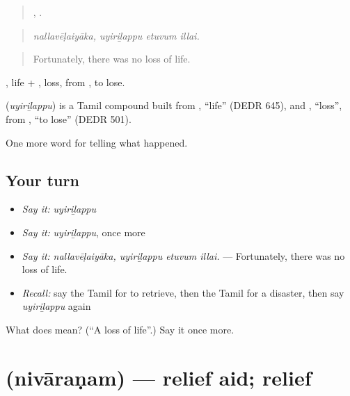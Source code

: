 \begin{quote}
,   .
\end{quote}

\begin{quote}
\emph{nallavēḷaiyāka, uyiriḻappu etuvum illai.}
\end{quote}

\begin{quote}
Fortunately, there was no loss of life.
\end{quote}

, life + , loss, from , to lose.

\begin{cousinweb}
\textbf{} (\emph{uyiriḻappu}) is a Tamil compound built from , \textquotedblleft{}life\textquotedblright{} (DEDR 645), and , \textquotedblleft{}loss\textquotedblright{}, from , \textquotedblleft{}to lose\textquotedblright{} (DEDR 501).
\end{cousinweb}

\begin{grammarlens}[title={What you've built}]
One more word for telling what happened.
\end{grammarlens}

\subsection*{Your turn}
\begin{itemize}
\raggedright
  \item \emph{Say it:} \emph{uyiriḻappu}
  \item \emph{Say it:} \emph{uyiriḻappu}, once more
  \item \emph{Say it:} \emph{nallavēḷaiyāka, uyiriḻappu etuvum illai.} — Fortunately, there was no loss of life.
  \item \emph{Recall:} say the Tamil for to retrieve, then the Tamil for a disaster, then say \emph{uyiriḻappu} again
\end{itemize}

\begin{tcolorbox}[breakable,colback=teal!4,colframe=teal!35!black,title={Before you move on}]
What does  mean? (\textquotedblleft{}A loss of life\textquotedblright{}.) Say it once more.
\end{tcolorbox}
\section[\texorpdfstring{\ta{நிவாரணம்} (nivāraṇam)}{நிவாரணம் (nivāraṇam)}]{ (nivāraṇam) — relief aid; relief}

